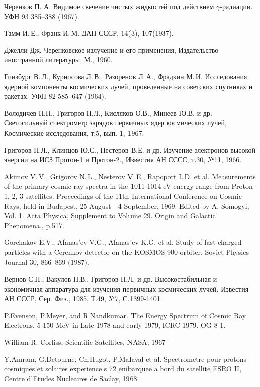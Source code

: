 \documentclass[12pt,a4paper]{report} %
\begin{document}
\begin{thebibliography}{00}

Черенков П. А. Видимое свечение чистых жидкостей под действием $\gamma$-радиации. УФН 93 385–388 (1967).

Тамм И.\,Е., Франк И.\,М. ДАН СССР, 14(3), 107(1937).

Джелли Дж.  Черенковское излучение и его применения, Издательство иностранной литературы, М., 1960.

Гинзбург В.\,Л., Курносова Л.\,В., Разоренов Л.\,А., Фрадкин М.\,И. Исследования ядерной компоненты космических лучей, проведенные на советских спутниках и ракетах. УФН 82 585–647 (1964).

Володичев Н.Н., Григоров Н.Л., Кисляков О.В., Минеев Ю.В. и др. Светосильный спектрометр зарядов первичных ядер космических лучей, Космические исследования, т.5, вып. 1, 1967.

Григоров Н.Л., Клинцов Ю.С., Нестеров В.Е. и др. Изучение электронов высокой энергии на ИСЗ Протон-1 и Протон-2., Известия АН СССС, т.30, №11, 1966.

Akimov V.\,V., Grigorov N.\,L., Nesterov V.\,E., Rapoport I.\,D. et al. Measurements of the primary cosmic ray spectra in the 1011-1014 eV energy range from Proton-1, 2, 3 satellites. Proceedings of the 11th International Conference on Cosmic Rays, held in Budapest, 25 August - 4 September, 1969. Edited by A. Somogyi, Vol. 1. Acta Physica, Supplement to Volume 29. Origin and Galactic Phenomena., p.517.

Gorchakov E.V., Afanas'ev V.G., Afanas'ev K.G. et al. Study of fast charged particles with a Cerenkov detector on the KOSMOS-900 orbiter. Soviet Physics Journal 30, 866–869 (1987).

 Вернов С.Н., Вакулов П.В., Григоров Н.Л. и др. Высокостабильная и экономичная аппаратура для изучения первичных космических лучей. Известия АН СССР, Сер. Физ., 1985, Т.49, №7, С.1399-1401.

P.Evenson, P.Meyer, and R.Nandkumar. The Energy Spectrum of Cosmic Ray Electrons, 5-150 MeV in Late 1978 and early 1979, ICRC 1979. OG 8-1.

William R. Corliss, Scientific Satellites, NASA, 1967

Y.Amram, G.Detourne, Ch.Hugot, P.Malaval et al. Spectrometre pour protons cosmiques et solaires experience s 72 embarquee a bord du satellite ESRO II, Centre d'Etudes Nucleaires de Saclay, 1968.


\end{thebibliography}
\end{document}
